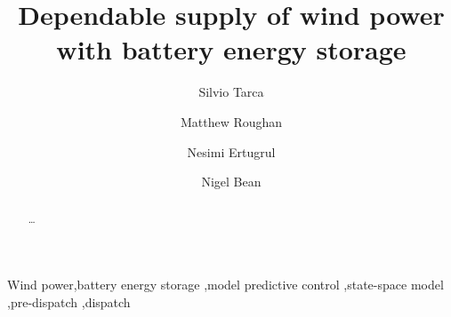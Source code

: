 \documentclass[a4paper, 10pt, twocolumn, preprint, 3p]{elsarticle}
\begin{document}
\begin{frontmatter}

\title{Dependable supply of wind power\\with battery energy storage}

\author[acems]{Silvio Tarca}

\author[acems]{Matthew Roughan}
\author[cet]{Nesimi Ertugrul}
\author[acems]{Nigel Bean}

\address[acems]{School of Mathematical Sciences and ARC Centre of Excellence for Mathematical \& Statistical Frontiers,\\The University of Adelaide, South Australia, 5005}
\address[cet]{School of Electrical \& Electronic Engineering and Centre for Energy Technology,\\The University of Adelaide, South Australia, 5005}

\begin{abstract}
\ldots
\end{abstract}

\begin{keyword}
Wind power\sep battery energy storage \sep model predictive control \sep state-space model \sep pre-dispatch \sep dispatch
\end{keyword}

\end{frontmatter}

\end{document}
